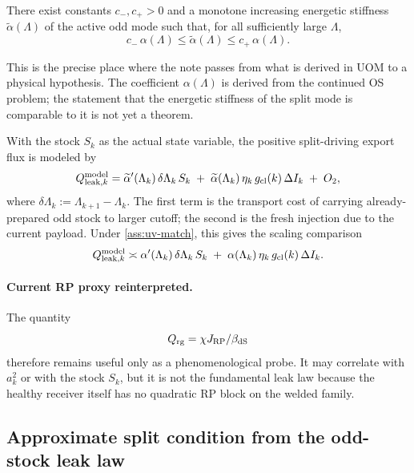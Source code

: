 \begin{assumption}
\label{ass:uv-match}
There exist constants \(c_-,c_+>0\) and a monotone increasing energetic stiffness \(\widetilde\alpha(\Lambda)\) of the
active odd mode such that, for all sufficiently large \(\Lambda\),
\begin{equation}
c_-\,\alpha(\Lambda)\le \widetilde\alpha(\Lambda)\le c_+\,\alpha(\Lambda).
\label{eq:alpha-comparable}
\end{equation}
\end{assumption}

This is the precise place where the note passes from what is derived in UOM to a physical hypothesis.
The coefficient \(\alpha(\Lambda)\) is derived from the continued OS problem; the statement that the energetic stiffness of
the split mode is comparable to it is not yet a theorem.

With the stock \(S_k\) as the actual state variable, the positive split-driving export flux is modeled by
\begin{equation}
Q_{{\rm leak},k}^{\rm model}
=
\widetilde\alpha'(\Lambda_k)\,\delta\Lambda_k\,S_k
\;+\;
\widetilde\alpha(\Lambda_k)\,\eta_k\,g_{\rm cl}(k)\,\Delta I_k
\;+\; O_2,
\label{eq:Qleak-effective}
\end{equation}
where \(\delta\Lambda_k:=\Lambda_{k+1}-\Lambda_k\).
The first term is the transport cost of carrying already-prepared odd stock to larger cutoff; the second is the fresh
injection due to the current payload.
Under \cref{ass:uv-match}, this gives the scaling comparison
\begin{equation}
Q_{{\rm leak},k}^{\rm model}
\asymp
\alpha'(\Lambda_k)\,\delta\Lambda_k\,S_k
\;+\;
\alpha(\Lambda_k)\,\eta_k\,g_{\rm cl}(k)\,\Delta I_k.
\label{eq:Qleak-alpha}
\end{equation}

\paragraph{Current RP proxy reinterpreted.}
The quantity
\[
Q_{\rm rg}=\chi J_{\rm RP}/\beta_{\rm dS}
\]
therefore remains useful only as a phenomenological probe. It may correlate with \(a_k^2\) or with the stock \(S_k\), but
it is not the fundamental leak law because the healthy receiver itself has no quadratic RP block on the welded family.

\subsection{Approximate split condition from the odd-stock leak law}
\label{subsec:split-threshold}

